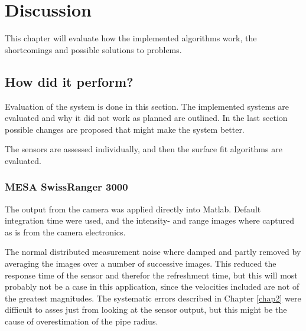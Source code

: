
\chapter{Discussion}
\label{chap8}
This chapter will evaluate how the implemented algorithms work, the shortcomings and
possible solutions to problems. 

\section{How did it perform?}
Evaluation of the system is done in this section. The implemented systems are evaluated
and why it did not work as planned are outlined. In the last section
possible changes are proposed that might make the system better. 

The sensors are assessed individually, and then the surface fit algorithms are evaluated.


\subsection{MESA SwissRanger 3000}
The output from the camera was applied directly into Matlab. Default
integration time were used, and the intensity- and range images where captured as is from
the camera electronics.

The normal distributed measurement noise where damped and partly removed by averaging the images over a number
of successive images. This reduced the response time of the sensor and therefor the
refreshment time, but this will most probably not be a case in this application, since the
velocities included are not of the greatest magnitudes. 
The systematic errors described in Chapter \ref{chap2} were difficult to asses just from
looking at the sensor output, but this might be the cause of overestimation of the pipe
radius. 


